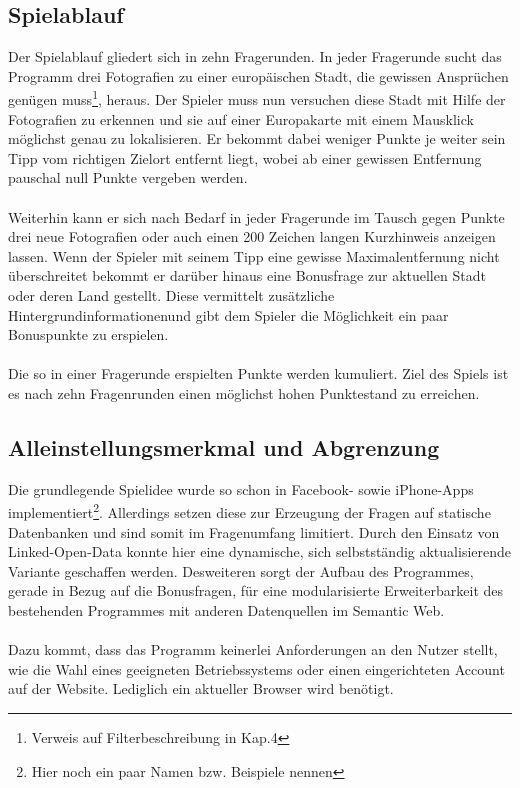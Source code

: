 \documentclass[a4paper, 11pt]{article}
\begin{document}
\subsection{Spielablauf}
Der Spielablauf gliedert sich in zehn Fragerunden. In jeder Fragerunde sucht das Programm drei Fotografien zu einer europäischen Stadt, die gewissen Ansprüchen genügen muss\footnote{Verweis auf Filterbeschreibung in Kap.4}, heraus. Der Spieler muss nun versuchen diese Stadt mit Hilfe der Fotografien zu erkennen und sie auf einer Europakarte mit einem Mausklick möglichst genau zu lokalisieren. Er bekommt dabei weniger Punkte je weiter sein Tipp vom richtigen Zielort entfernt liegt, wobei ab einer gewissen Entfernung pauschal null Punkte vergeben werden.\\\\ Weiterhin kann er sich nach Bedarf in jeder Fragerunde im Tausch gegen Punkte drei neue Fotografien oder auch einen 200 Zeichen langen Kurzhinweis anzeigen lassen. Wenn der Spieler mit seinem Tipp eine gewisse Maximalentfernung nicht überschreitet bekommt er darüber hinaus eine Bonusfrage zur aktuellen Stadt oder deren Land gestellt. Diese vermittelt zusätzliche Hintergrundinformationenund gibt dem Spieler die Möglichkeit ein paar Bonuspunkte zu erspielen.\\\\ Die so in einer Fragerunde erspielten Punkte werden kumuliert. Ziel des Spiels ist es nach zehn Fragenrunden einen möglichst hohen Punktestand zu erreichen.
\subsection{Alleinstellungsmerkmal und Abgrenzung}
Die grundlegende Spielidee wurde so schon in Facebook- sowie iPhone-Apps implementiert\footnote{Hier noch ein paar Namen bzw. Beispiele nennen}. Allerdings setzen diese zur Erzeugung der Fragen auf statische Datenbanken und sind somit im Fragenumfang limitiert. Durch den Einsatz von Linked-Open-Data konnte hier eine dynamische, sich selbstständig aktualisierende Variante geschaffen werden. Desweiteren sorgt der Aufbau des Programmes, gerade in Bezug auf die Bonusfragen, für eine modularisierte Erweiterbarkeit des bestehenden Programmes mit anderen Datenquellen im Semantic Web.\\\\Dazu kommt, dass das Programm keinerlei Anforderungen an den Nutzer stellt, wie die Wahl eines geeigneten Betriebssystems oder einen eingerichteten Account auf der Website. Lediglich ein aktueller Browser wird benötigt.
\end{document}
